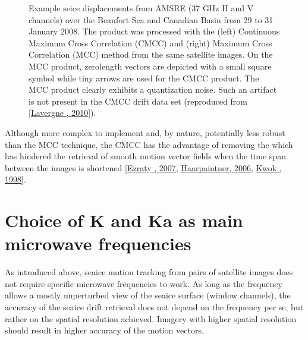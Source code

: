 \documentclass[letterpaper,10pt,english]{jupyterBook}
\begin{document}
\begin{figure}[htbp]
\centering
\capstart

\noindent{}
\caption{Example se\sphinxhyphen{}ice displacements from AMSR\sphinxhyphen{}E (37 GHz H and V channels) over the Beaufort Sea and Canadian Basin from 29 to 31 January 2008. The product was processed with the (left) Continuous Maximum Cross Correlation (CMCC) and (right) Maximum Cross Correlation (MCC) method from the same satellite images. On the MCC product, zero\sphinxhyphen{}length vectors are depicted with a small square symbol while tiny arrows are used for the CMCC product. The MCC product clearly exhibits a quantization noise. Such an artifact is not present in the CMCC drift data set (reproduced from {[}\hyperlink{cite.references:id19}{Lavergne , 2010}{]}).}\label{\detokenize{background_justification_algorithm:fig-cmcc-vs-mcc}}\end{figure}

\sphinxAtStartPar
Although more complex to implement and, by nature, potentially less
robust than the MCC technique, the CMCC has the advantage of removing
the  which has hindered the retrieval of smooth
motion vector fields when the time span between the images is shortened
{[}\hyperlink{cite.references:id5}{Ezraty , 2007}, \hyperlink{cite.references:id9}{Haarpaintner, 2006}, \hyperlink{cite.references:id14}{Kwok , 1998}{]}.


\section{Choice of K and Ka as main microwave frequencies}
\label{\detokenize{background_justification_algorithm:choice-of-k-and-ka-as-main-microwave-frequencies}}
\sphinxAtStartPar
As introduced above, sea\sphinxhyphen{}ice motion tracking from pairs of satellite images does not require specific microwave frequencies to work. As long as
the frequency allows a mostly unperturbed view of the sea\sphinxhyphen{}ice surface (window channels), the accuracy of the sea\sphinxhyphen{}ice drift retrieval does not
depend on the frequency per se, but rather on the spatial resolution achieved. Imagery with higher spatial resolution should result in higher
accuracy of the motion vectors.
\end{document}

